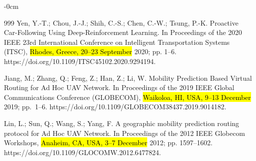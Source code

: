 \documentclass[electronics,aricle,accept,pdftex,moreauthors]{Definitions/mdpi}
\begin{document}
\begin{adjustwidth}{-\extralength}{0cm}
\begin{thebibliography}{999}
Yen, Y.-T.; Chou, J.-J.; Shih, C.-S.; Chen, C.-W.; Tsung, P.-K. Proactive Car-Following Using Deep-Reinforcement Learning. In Proceedings of the  {2020 IEEE 23rd International Conference on Intelligent Transportation Systems (ITSC)}, \hl{Rhodes, Greece, 20--23 September} 2020; pp. 1--6. https://doi.org/10.1109/ITSC45102.2020.9294194.

Jiang, M.; Zhang, Q.; Feng, Z.; Han, Z.; Li, W. Mobility Prediction Based Virtual Routing for Ad Hoc UAV Network. In Proceedings of the {2019 IEEE Global Communications Conference (GLOBECOM)}, \hl{Waikoloa, HI, USA, 9--13 December} 2019; pp.~1--6. https://doi.org/10.1109/GLOBECOM38437.2019.9014182.

Lin, L.; Sun, Q.; Wang, S.; Yang, F. A geographic mobility prediction routing protocol for Ad Hoc UAV Network. In Proceedings of the {2012 IEEE Globecom Workshops},  \hl{Anaheim, CA, USA, 3--7 December} 2012; pp. 1597--1602. https://doi.org/10.1109/GLOCOMW.2012.6477824.

\end{thebibliography}
\end{adjustwidth}
\end{document}
